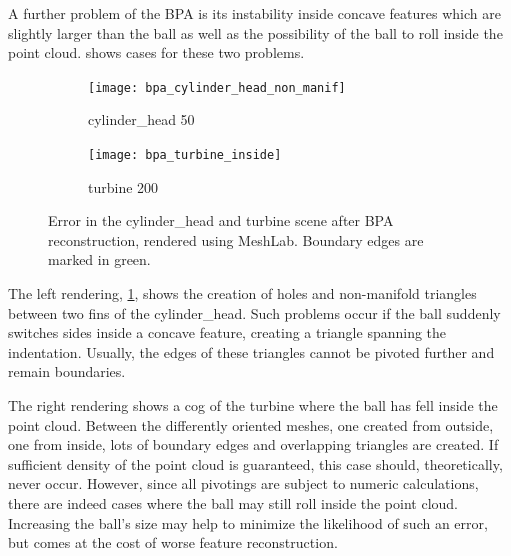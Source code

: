A further problem of the BPA is its instability inside concave features which are slightly larger than the ball as well as the possibility of the ball to roll inside the point cloud.
 shows cases for these two problems.
%
\begin{figure}
	\centering
	\begin{subfigure}[b]{0.49\textwidth}
		\centering
		\texttt{[image: bpa\_cylinder\_head\_non\_manif]}
		\caption{cylinder\_head 50}
		\label{fig:bpa_cylinder_head_non_manif}
	\end{subfigure}
	\begin{subfigure}[b]{0.49\textwidth}
		\centering
		\texttt{[image: bpa\_turbine\_inside]}
		\caption{turbine 200}
		\label{fig:bpa_turbine_inside}
	\end{subfigure}
	\caption{
		Error in the cylinder\_head and turbine scene after BPA reconstruction, rendered using MeshLab.
		Boundary edges are marked in green.
	}
	\label{fig:bpa_issues}
\end{figure}

The left rendering, \cref{fig:bpa_cylinder_head_non_manif}, shows the creation of holes and non-manifold triangles between two fins of the cylinder\_head.
Such problems occur if the ball suddenly switches sides inside a concave feature, creating a triangle spanning the indentation.
Usually, the edges of these triangles cannot be pivoted further and remain boundaries.

The right rendering shows a cog of the turbine where the ball has fell inside the point cloud.
Between the differently oriented meshes, one created from outside, one from inside, lots of boundary edges and overlapping triangles are created.
If sufficient density of the point cloud is guaranteed, this case should, theoretically, never occur.
However, since all pivotings are subject to numeric calculations, there are indeed cases where the ball may still roll inside the point cloud.
Increasing the ball's size may help to minimize the likelihood of such an error, but comes at the cost of worse feature reconstruction.

